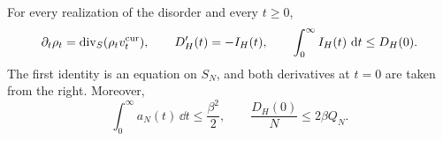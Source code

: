 \begin{lemma}\label{lem:entropy-budget}
For every realization of the disorder and every $t\ge0$,
\begin{equation}
 \partial_t\rho_t=\operatorname{div}_S(\rho_tv^{\mathrm{cur}}_t),\qquad
 D_H'(t)=-I_H(t),\qquad
 \int_0^\infty I_H(t)\,\mathop{}\!\mathrm d t\le D_H(0).
 \label{eq:quenched-entropy-dissipation}
\end{equation}
The first identity is an equation on $S_N$, and both derivatives at $t=0$ are taken from the right.
Moreover,
\begin{equation}
 \int_0^\infty a_N(t)\,\dd t\le\frac{\beta^2}{2},
 \qquad
 \frac{D_H(0)}N\le2\beta Q_N.
 \label{eq:normalized-entropy-budget}
\end{equation}
\end{lemma}

